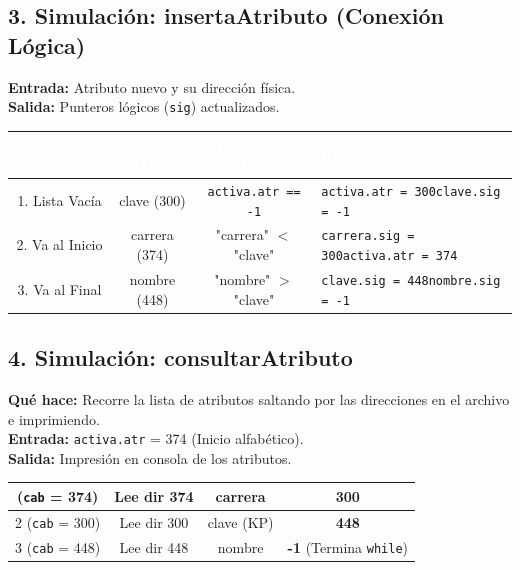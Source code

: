 \documentclass[12pt]{article}
\begin{document}
{}
\subsection*{3. Simulación: insertaAtributo (Conexión Lógica)}
\textbf{Entrada:} Atributo nuevo y su dirección física. \\
\textbf{Salida:} Punteros lógicos (\verb|sig|) actualizados.

\begin{table}[H]
\centering
\renewcommand{\arraystretch}{1.05}
\begin{tabular}{|c|c|c|p{5.5cm}|}
\hline
\rowcolor{MainBlue}
\textcolor{white}{\textbf{Caso Evaluado}} & \textcolor{white}{\textbf{Entra (Dir)}} & \textcolor{white}{\textbf{Evaluación \texttt{strcmp}}} & \textcolor{white}{\textbf{Resultado Variable}} \\
\hline
1. Lista Vacía & clave (300) & \verb|activa.atr == -1| & \verb|activa.atr = 300|\newline \verb|clave.sig = -1| \\
\hline
2. Va al Inicio & carrera (374) & "carrera" $<$ "clave" & \verb|carrera.sig = 300|\newline \verb|activa.atr = 374| \\
\hline
3. Va al Final & nombre (448) & "nombre" $>$ "clave" & \verb|clave.sig = 448|\newline \verb|nombre.sig = -1| \\
\hline
\end{tabular}
\end{table}

{}
\subsection*{4. Simulación: consultarAtributo}
\textbf{Qué hace:} Recorre la lista de atributos saltando por las direcciones en el archivo e imprimiendo.\\
\textbf{Entrada:} \verb|activa.atr| = 374 (Inicio alfabético).\\
\textbf{Salida:} Impresión en consola de los atributos.

\begin{table}[H]
\centering
\renewcommand{\arraystretch}{1.05}
\begin{tabular}{|c|c|c|c|}
\hline
\rowcolor{MainBlue}
\hline
1 (\verb|cab| = 374) & Lee dir 374 & carrera & \textbf{300} \\
\hline
2 (\verb|cab| = 300) & Lee dir 300 & clave (KP) & \textbf{448} \\
\hline
3 (\verb|cab| = 448) & Lee dir 448 & nombre & \textbf{-1} (Termina \verb|while|) \\
\hline
\end{tabular}
\end{table}
\end{document}
